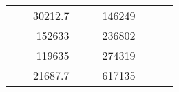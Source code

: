 \begin{table}[H]
\begin{tabular}{|ccrccrccc}
\multicolumn{1}{|c|}{\cellcolor[HTML]{FFFFC7}}                                & \multicolumn{1}{c|}{\cellcolor[HTML]{DDFDFF}}                      & \multicolumn{1}{r|}{\cellcolor[HTML]{DAE8FC}30212.7}   & \multicolumn{1}{c|}{\cellcolor[HTML]{FFFFC7}}                                & \multicolumn{1}{c|}{\cellcolor[HTML]{DDFDFF}}                       & \multicolumn{1}{r|}{\cellcolor[HTML]{DDFDFF}146249}    &                                                                              &                                                                    &                                                        \\ \cline{3-3} \cline{6-6}
\multicolumn{1}{|c|}{\cellcolor[HTML]{FFFFC7}}                                & \multicolumn{1}{c|}{\cellcolor[HTML]{DDFDFF}}                      & \multicolumn{1}{r|}{\cellcolor[HTML]{DDFDFF}152633}    & \multicolumn{1}{c|}{\cellcolor[HTML]{FFFFC7}}                                & \multicolumn{1}{c|}{\cellcolor[HTML]{DDFDFF}}                       & \multicolumn{1}{r|}{\cellcolor[HTML]{DAE8FC}236802}    &                                                                              &                                                                    &                                                        \\ \cline{3-3} \cline{6-6}
\multicolumn{1}{|c|}{\cellcolor[HTML]{FFFFC7}}                                & \multicolumn{1}{c|}{\cellcolor[HTML]{DDFDFF}}                      & \multicolumn{1}{r|}{\cellcolor[HTML]{DAE8FC}119635}    & \multicolumn{1}{c|}{\cellcolor[HTML]{FFFFC7}}                                & \multicolumn{1}{c|}{\cellcolor[HTML]{DDFDFF}}                       & \multicolumn{1}{r|}{\cellcolor[HTML]{DDFDFF}274319}    &                                                                              &                                                                    &                                                        \\ \cline{3-3} \cline{6-6}
\multicolumn{1}{|c|}{\cellcolor[HTML]{FFFFC7}}                                & \multicolumn{1}{c|}{\cellcolor[HTML]{DDFDFF}}                      & \multicolumn{1}{r|}{\cellcolor[HTML]{DDFDFF}21687.7}   & \multicolumn{1}{c|}{\cellcolor[HTML]{FFFFC7}}                                & \multicolumn{1}{c|}{\cellcolor[HTML]{DDFDFF}}                       & \multicolumn{1}{r|}{\cellcolor[HTML]{DAE8FC}617135}    &                                                                              &                                                                    &                                                        \\ \cline{3-3} \cline{6-6}

\end{tabular}
\end{table}
